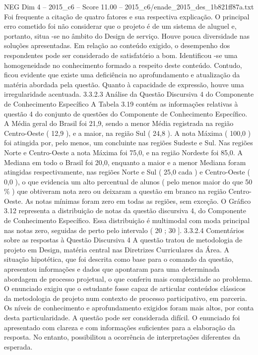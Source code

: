 \begin{textsample}{NEG Dim 4 – 2015\_c6 – Score 11.00 – 2015\_c6/enade\_2015\_des\_1b821ff87a.txt}
Foi frequente a citação de quatro fatores e sua respectiva explicação.
O principal erro cometido foi não considerar que o projeto é de um sistema de aluguel e, portanto, situa -se no âmbito do Design de serviço.
Houve pouca diversidade nas soluções apresentadas.
Em relação ao conteúdo exigido, o desempenho dos respondentes pode ser considerado de satisfatório a bom.
Identificou -se uma homogeneidade no conhecimento formado a respeito deste conteúdo.
Contudo, ficou evidente que existe uma deficiência no aprofundamento e atualização da matéria abordada pela questão.
Quanto à capacidade de expressão, houve uma irregularidade acentuada. 3.3.2.3 Análise da Questão Discursiva 4 do Componente de Conhecimento Específico A Tabela 3.19 contém as informações relativas à questão 4 do conjunto de questões do Componente de Conhecimento Específico.
A Média geral do Brasil foi 21,9, sendo a menor Média registrada na região Centro-Oeste ( 12,9 ), e a maior, na região Sul ( 24,8 ).
A nota Máxima ( 100,0 ) foi atingida por, pelo menos, um concluinte nas regiões Sudeste e Sul.
Nas regiões Norte e Centro-Oeste a nota Máxima foi 75,0, e na região Nordeste foi 85,0.
A Mediana em todo o Brasil foi 20,0, enquanto a maior e a menor Mediana foram atingidas respectivamente, nas regiões Norte e Sul ( 25,0 cada ) e Centro-Oeste ( 0,0 ), o que evidencia um alto percentual de alunos ( pelo menos maior do que 50 \% ) que obtiveram nota zero ou deixaram a questão em branco na região Centro-Oeste.
As notas mínimas foram zero em todas as regiões, sem exceção.
O Gráfico 3.12 representa a distribuição de notas da questão discursiva 4, do Componente de Conhecimento Específico.
Essa distribuição é multimodal com moda principal nas notas zero, seguidas de perto pelo intervalo ( 20 ; 30 ]. 3.3.2.4 Comentários sobre as respostas à Questão Discursiva 4 A questão tratou de metodologia de projeto em Design, matéria central nas Diretrizes Curriculares da Área.
A situação hipotética, que foi descrita como base para o comando da questão, apresentou informações e dados que apontaram para uma determinada abordagem de processo projetual, o que conferiu mais complexidade ao problema.
O enunciado exigiu que o estudante fosse capaz de articular conteúdos clássicos da metodologia de projeto num contexto de processo participativo, em parceria.
Os níveis de conhecimento e aprofundamento exigidos foram mais altos, por conta desta particularidade.
A questão pode ser considerada difícil.
O enunciado foi apresentado com clareza e com informações suficientes para a elaboração da resposta.
No entanto, possibilitou a ocorrência de interpretações diferentes da esperada.

\end{textsample}

